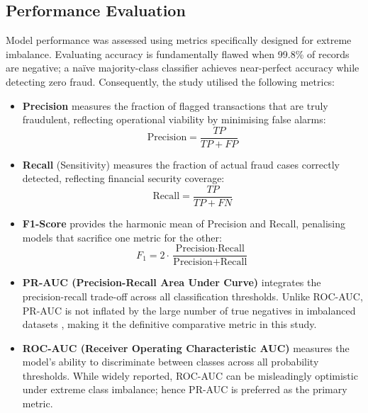 \documentclass[a4paper,fleqn]{cas-sc}
\begin{document}
\subsection{Performance Evaluation}

Model performance was assessed using metrics specifically designed for extreme imbalance. Evaluating accuracy is fundamentally flawed when 99.8\% of records are negative; a na\"ive majority-class classifier achieves near-perfect accuracy while detecting zero fraud. Consequently, the study utilised the following metrics:
\begin{itemize}
    \item \textbf{Precision} measures the fraction of flagged transactions that are truly fraudulent, reflecting operational viability by minimising false alarms:
    \begin{equation}
    \text{Precision} = \frac{TP}{TP + FP}
    \label{eq:precision}
    \end{equation}
    
    \item \textbf{Recall} (Sensitivity) measures the fraction of actual fraud cases correctly detected, reflecting financial security coverage:
    \begin{equation}
    \text{Recall} = \frac{TP}{TP + FN}
    \label{eq:recall}
    \end{equation}
    
    \item \textbf{F1-Score} provides the harmonic mean of Precision and Recall, penalising models that sacrifice one metric for the other:
    \begin{equation}
    F_1 = 2 \cdot \frac{\text{Precision} \cdot \text{Recall}}{\text{Precision} + \text{Recall}}
    \label{eq:f1}
    \end{equation}
    
    \item \textbf{PR-AUC (Precision-Recall Area Under Curve)} integrates the precision-recall trade-off across all classification thresholds. Unlike ROC-AUC, PR-AUC is not inflated by the large number of true negatives in imbalanced datasets \cite{Saito2015PrecisionRecall}, making it the definitive comparative metric in this study.
    
    \item \textbf{ROC-AUC (Receiver Operating Characteristic AUC)} measures the model's ability to discriminate between classes across all probability thresholds. While widely reported, ROC-AUC can be misleadingly optimistic under extreme class imbalance; hence PR-AUC is preferred as the primary metric.
\end{itemize}
\end{document}
